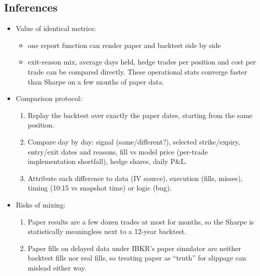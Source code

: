 \documentclass{article}
\begin{document}
\subsection{Inferences}

\begin{itemize}

\item [SUGGESTION] Value of identical metrics:

\begin{itemize}

\item one report function can render paper and backtest side by side

\item exit-reason mix, average days held, hedge trades per position and cost per trade can be compared directly. These operational stats converge faster than Sharpe on a few months of paper data.

\end{itemize}

\item [SUGGESTION] Comparison protocol:

\begin{enumerate}

\item Replay the backtest over exactly the paper dates, starting from the same position.

\item Compare day by day: signal (same/\allowbreak{}different?), selected strike/\allowbreak{}expiry, entry/\allowbreak{}exit dates and reasons, fill vs model price (per-trade implementation shortfall), hedge shares, daily P\&L.

\item Attribute each difference to data (IV source), execution (fills, misses), timing (10:15 vs snapshot time) or logic (bug).

\end{enumerate}

\item [INFERENCE] Risks of mixing:

\begin{enumerate}

\item Paper results are a few dozen trades at most for months, so the Sharpe is statistically meaningless next to a 12-year backtest.

\item Paper fills on delayed data under IBKR's paper simulator are neither backtest fills nor real fills, so treating paper as ``truth'' for slippage can mislead either way.


\end{enumerate}
\end{itemize}
\end{document}

